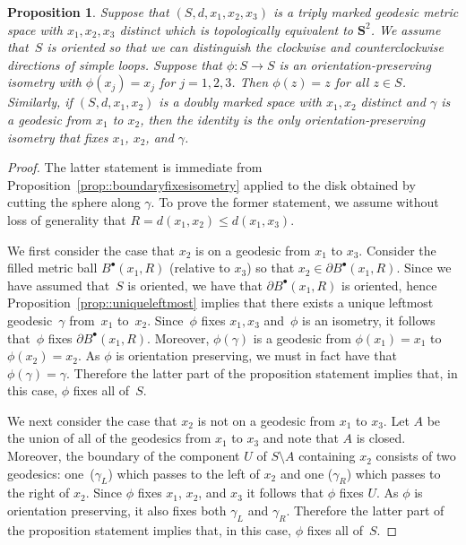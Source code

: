 \documentclass[JEP,XML,SOM,Unicode]{cedram}
\newcommand{\sbullet}{{\scriptscriptstyle\bullet}}
\theoremstyle{plain}
\numberwithin{theorem}{section}
\newtheorem{proposition}[theorem]{Proposition}
\theoremstyle{definition}
\renewcommand{\S}{{\mathbf S}}
\newcommand{\fb}[2]{B^\sbullet(#1,#2)}
\begin{document}
\begin{proposition}
\label{prop::threepointsfixisometry}
Suppose that $(S,d,x_1,x_2,x_3)$ is a triply marked geodesic metric space with $x_1,x_2,x_3$ distinct which is topologically equivalent to $\S^2$. We assume that~$S$ is oriented so that we can distinguish the clockwise and counterclockwise directions of simple loops. Suppose that $\phi \colon S \to S$ is an orientation-preserving isometry with $\phi(x_j) = x_j$ for $j=1,2,3$. Then $\phi(z) = z$ for all $z \in S$. Similarly, if $(S,d,x_1, x_2)$ is a doubly marked space with $x_1,x_2$ distinct and $\gamma$ is a geodesic from $x_1$ to $x_2$, then the identity is the only orientation-preserving isometry that fixes $x_1$, $x_2$, and $\gamma$.
\end{proposition}
\begin{proof}
The latter statement is immediate from Proposition~\ref{prop::boundaryfixesisometry} applied to the disk obtained by cutting the sphere along $\gamma$. To prove the former statement, we assume without loss of generality that $R = d(x_1,x_2) \leq d(x_1,x_3)$.

We first consider the case that $x_2$ is on a geodesic from $x_1$ to $x_3$. Consider the filled metric ball $\fb{x_1}{R}$ (relative to $x_3$) so that $x_2 \in \partial \fb{x_1}{R}$. Since we have assumed that~$S$ is oriented, we have that $\partial \fb{x_1}{R}$ is oriented, hence Proposition~\ref{prop::uniqueleftmost} implies that there exists a unique leftmost geodesic~$\gamma$ from~$x_1$ to~$x_2$. Since~$\phi$ fixes $x_1,x_3$ and~$\phi$ is an isometry, it follows that~$\phi$ fixes $\partial \fb{x_1}{R}$. Moreover, $\phi(\gamma)$ is a geodesic from $\phi(x_1) = x_1$ to $\phi(x_2) = x_2$. As $\phi$ is orientation preserving, we must in fact have that $\phi(\gamma) = \gamma$. Therefore the latter part of the proposition statement implies that, in this case, $\phi$ fixes all of~$S$.

We next consider the case that $x_2$ is not on a geodesic from $x_1$ to $x_3$. Let $A$ be the union of all of the geodesics from $x_1$ to $x_3$ and note that $A$ is closed. Moreover, the boundary of the component $U$ of $S \setminus A$ containing $x_2$ consists of two geodesics: one~($\gamma_L$) which passes to the left of $x_2$ and one ($\gamma_R$) which passes to the right of $x_2$. Since $\phi$ fixes $x_1$, $x_2$, and $x_3$ it follows that $\phi$ fixes $U$. As $\phi$ is orientation preserving, it also fixes both $\gamma_L$ and $\gamma_R$. Therefore the latter part of the proposition statement implies that, in this case, $\phi$ fixes all of~$S$.
\end{proof}
\end{document}

